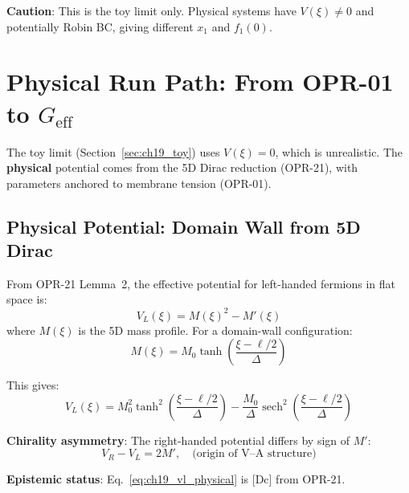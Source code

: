 \textbf{Caution}: This is the toy limit only. Physical systems have $V(\xi) \neq 0$
and potentially Robin BC, giving different $x_1$ and $f_1(0)$.


\section{Physical Run Path: From OPR-01 to $G_{\text{eff}}$}
\label{sec:ch19_physical_run}

The toy limit (Section~\ref{sec:ch19_toy}) uses $V(\xi) = 0$, which is unrealistic.
The \textbf{physical} potential comes from the 5D Dirac reduction (OPR-21), with
parameters anchored to membrane tension (OPR-01).

\subsection{Physical Potential: Domain Wall from 5D Dirac}
\label{sec:ch19_physical_potential}

From OPR-21 Lemma~2, the effective potential for left-handed fermions in flat space is:
\begin{equation}
    V_L(\xi) = M(\xi)^2 - M'(\xi)
    \label{eq:ch19_vl_physical}
\end{equation}
where $M(\xi)$ is the 5D mass profile. For a domain-wall configuration:
\begin{equation}
    M(\xi) = M_0 \tanh\left(\frac{\xi - \ell/2}{\Delta}\right)
    \label{eq:ch19_mass_profile}
\end{equation}

This gives:
\begin{equation}
    V_L(\xi) = M_0^2 \tanh^2\left(\frac{\xi - \ell/2}{\Delta}\right)
    - \frac{M_0}{\Delta} \operatorname{sech}^2\left(\frac{\xi - \ell/2}{\Delta}\right)
    \label{eq:ch19_vl_explicit}
\end{equation}

\textbf{Chirality asymmetry}: The right-handed potential differs by sign of $M'$:
\begin{equation}
    V_R - V_L = 2M', \quad \text{(origin of V--A structure)}
\end{equation}

\textbf{Epistemic status}: Eq.~\eqref{eq:ch19_vl_physical} is [Dc] from OPR-21.

